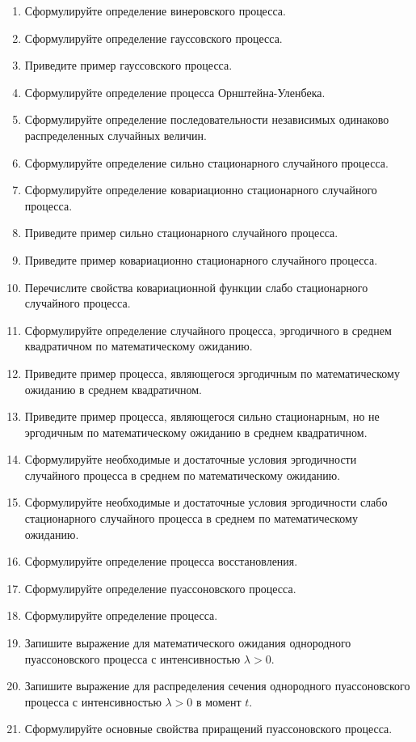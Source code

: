 \documentclass[a4paper,12pt]{extreport}
\renewcommand{\=}[1]{\stackrel{#1}{=}} %
\begin{document}
\begin{enumerate}

	\item Сформулируйте определение винеровского процесса.
	\item Сформулируйте определение гауссовского процесса.
	\item Приведите пример гауссовского процесса.
	\item Сформулируйте определение процесса Орнштейна-Уленбека.

	\item Сформулируйте определение последовательности независимых 
	одинаково распределенных случайных величин.
	\item Сформулируйте определение сильно стационарного случайного процесса.
	\item Сформулируйте определение ковариационно стационарного случайного процесса.
	\item Приведите пример сильно стационарного случайного процесса.
	\item Приведите пример ковариационно стационарного случайного процесса.
	\item Перечислите свойства ковариационной функции 
	слабо стационарного случайного процесса.
	\item Сформулируйте определение случайного процесса,
	эргодичного в среднем квадратичном по математическому ожиданию.
	\item Приведите пример процесса, являющегося эргодичным по математическому ожиданию
	в среднем квадратичном.
	\item Приведите пример процесса, являющегося сильно стационарным, 
	но не эргодичным по математическому ожиданию
	в среднем квадратичном.
	\item Сформулируйте необходимые и достаточные условия эргодичности
	случайного процесса в среднем по математическому ожиданию.
	\item Сформулируйте необходимые и достаточные условия эргодичности
	слабо стационарного случайного процесса в среднем по математическому ожиданию.

	\item Сформулируйте определение процесса восстановления.
	\item Сформулируйте определение пуассоновского процесса.
	\item Сформулируйте определение процесса.
	\item Запишите выражение для математического ожидания
	однородного пуассоновского процесса с интенсивностью $\lambda > 0$.
	\item Запишите выражение для распределения сечения
	однородного пуассоновского процесса с интенсивностью $\lambda > 0$
	в момент $t$.
	\item Сформулируйте основные свойства приращений пуассоновского процесса.


\end{enumerate}
\end{document}
